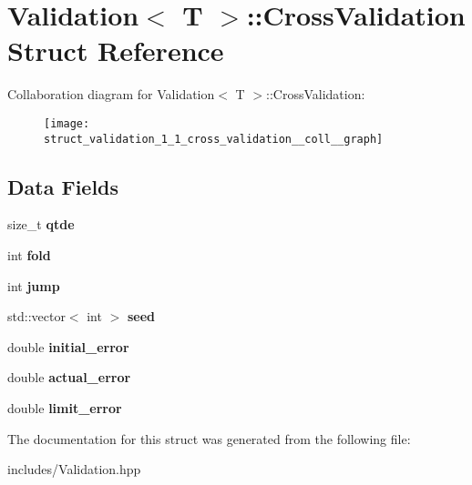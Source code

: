 \hypertarget{struct_validation_1_1_cross_validation}{}\section{Validation$<$ T $>$\+:\+:Cross\+Validation Struct Reference}
\label{struct_validation_1_1_cross_validation}


Collaboration diagram for Validation$<$ T $>$\+:\+:Cross\+Validation\+:
\nopagebreak
\begin{figure}[H]
\begin{center}
\leavevmode
\texttt{[image: struct\_validation\_1\_1\_cross\_validation\_\_coll\_\_graph]}
\end{center}
\end{figure}
\subsection*{Data Fields}
\begin{DoxyCompactItemize}
\item 
\mbox{\label{struct_validation_1_1_cross_validation_a1390b0775383e95347b9d502376b028a}} 
size\+\_\+t {\bfseries qtde}
\item 
\mbox{\label{struct_validation_1_1_cross_validation_a24522e62bed86b222427793059358453}} 
int {\bfseries fold}
\item 
\mbox{\label{struct_validation_1_1_cross_validation_aaa216ea500fc18c08d5b2b6ecfa2d6b5}} 
int {\bfseries jump}
\item 
\mbox{\label{struct_validation_1_1_cross_validation_a759a6c1c6ebce11575401fb0cc397e06}} 
std\+::vector$<$ int $>$ {\bfseries seed}
\item 
\mbox{\label{struct_validation_1_1_cross_validation_acdccfcf784001cd120096263fe27e03d}} 
double {\bfseries initial\+\_\+error}
\item 
\mbox{\label{struct_validation_1_1_cross_validation_a58b86e73f6085890ec4cf4b755bb5ab0}} 
double {\bfseries actual\+\_\+error}
\item 
\mbox{\label{struct_validation_1_1_cross_validation_af6298877a122a8e4bcd447277476677b}} 
double {\bfseries limit\+\_\+error}
\end{DoxyCompactItemize}


The documentation for this struct was generated from the following file\+:\begin{DoxyCompactItemize}
\item 
includes/Validation.\+hpp\end{DoxyCompactItemize}
